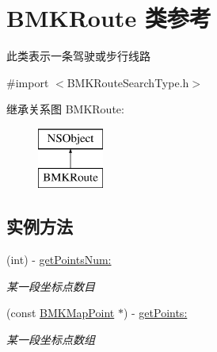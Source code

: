 \hypertarget{interface_b_m_k_route}{\section{B\-M\-K\-Route 类参考}
\label{interface_b_m_k_route}
}


此类表示一条驾驶或步行线路  




{\ttfamily \#import $<$B\-M\-K\-Route\-Search\-Type.\-h$>$}

继承关系图 B\-M\-K\-Route\-:\begin{figure}[H]
\begin{center}
\leavevmode
\includegraphics[height=2.000000cm]{interface_b_m_k_route}
\end{center}
\end{figure}
\subsection*{实例方法}
\begin{DoxyCompactItemize}
\item 
\hypertarget{interface_b_m_k_route_a801ea786b1a632afe3ac821ce4d4d4b8}{(int) -\/ \hyperlink{interface_b_m_k_route_a801ea786b1a632afe3ac821ce4d4d4b8}{get\-Points\-Num\-:}}\label{interface_b_m_k_route_a801ea786b1a632afe3ac821ce4d4d4b8}

\begin{DoxyCompactList}\small\item\em 某一段坐标点数目 \end{DoxyCompactList}\item 
\hypertarget{interface_b_m_k_route_ac51eaf7beb1aa2ba6e26a46b953668ee}{(const \hyperlink{struct_b_m_k_map_point}{B\-M\-K\-Map\-Point} $\ast$) -\/ \hyperlink{interface_b_m_k_route_ac51eaf7beb1aa2ba6e26a46b953668ee}{get\-Points\-:}}\label{interface_b_m_k_route_ac51eaf7beb1aa2ba6e26a46b953668ee}

\begin{DoxyCompactList}\small\item\em 某一段坐标点数组 \end{DoxyCompactList}\end{DoxyCompactItemize}
